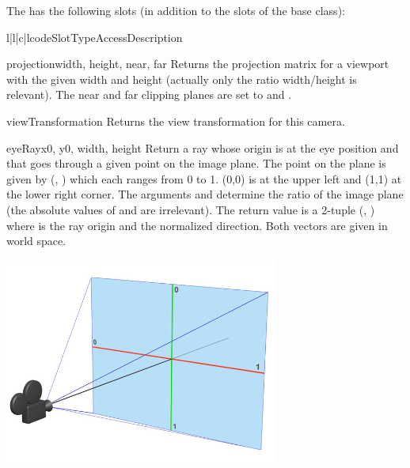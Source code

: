 The  has the following slots (in addition to the slots
of the  base class):

\begin{tableiv}{l|l|c|l}{code}{Slot}{Type}{Access}{Description}
\end{tableiv}

\begin{methoddesc}{projection}{width, height, near, far}
Returns the projection matrix for a viewport with the given width and
height (actually only the ratio width/height is relevant). The near
and far clipping planes are set to  and .
\end{methoddesc}

\begin{methoddesc}{viewTransformation}{}
Returns the view transformation for this camera.
\end{methoddesc}

\begin{methoddesc}{eyeRay}{x0, y0, width, height}
Return a ray whose origin is at the eye position and that goes through
a given point on the image plane. The point on the plane is given by
(, ) which each ranges from 0 to 1. (0,0) is at the
upper left and (1,1) at the lower right corner. The arguments  and
 determine the ratio of the image plane (the absolute
values of  and
 are irrelevant). The return value is a 2-tuple (, )
where  is the ray origin and  the normalized
direction. Both vectors are given in world space.

\begin{center}
\includegraphics[width=9cm]{pics/camera01}
\end{center}
\end{methoddesc}

